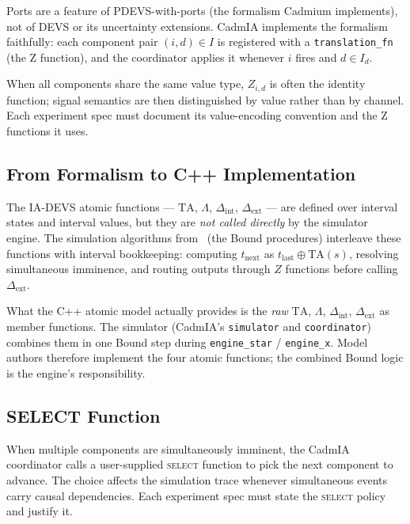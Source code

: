 Ports are a feature of PDEVS-with-ports (the formalism Cadmium implements),
not of DEVS or its uncertainty extensions.  CadmIA implements the formalism
faithfully: each component pair $(i, d) \in I$ is registered with a
\texttt{translation\_fn} (the Z function), and the coordinator applies it
whenever $i$ fires and $d \in I_d$.

When all components share the same value type, $Z_{i,d}$ is often the
identity function; signal semantics are then distinguished by value rather
than by channel.  Each experiment spec must document its value-encoding
convention and the Z functions it uses.

\subsection*{From Formalism to C++ Implementation}

The IA-DEVS atomic functions --- $\mathrm{TA}$, $\Lambda$,
$\Delta_{\text{int}}$, $\Delta_{\text{ext}}$ --- are defined over interval
states and interval values, but they are \emph{not called directly} by the
simulator engine.  The simulation algorithms from~\cite{VDW21} (the Bound
procedures) interleave these functions with interval bookkeeping: computing
$t_{\text{next}}$ as $t_{\text{last}} \oplus \mathrm{TA}(s)$, resolving
simultaneous imminence, and routing outputs through $Z$ functions before
calling $\Delta_{\text{ext}}$.

What the C++ atomic model actually provides is the \emph{raw} $\mathrm{TA}$,
$\Lambda$, $\Delta_{\text{int}}$, $\Delta_{\text{ext}}$ as member functions.
The simulator (CadmIA's \texttt{simulator} and \texttt{coordinator}) combines
them in one Bound step during \texttt{engine\_star} / \texttt{engine\_x}.
Model authors therefore implement the four atomic functions; the combined
Bound logic is the engine's responsibility.

\subsection*{SELECT Function}

When multiple components are simultaneously imminent, the CadmIA coordinator
calls a user-supplied \textsc{select} function to pick the next component to
advance.  The choice affects the simulation trace whenever simultaneous events
carry causal dependencies.  Each experiment spec must state the \textsc{select}
policy and justify it.
